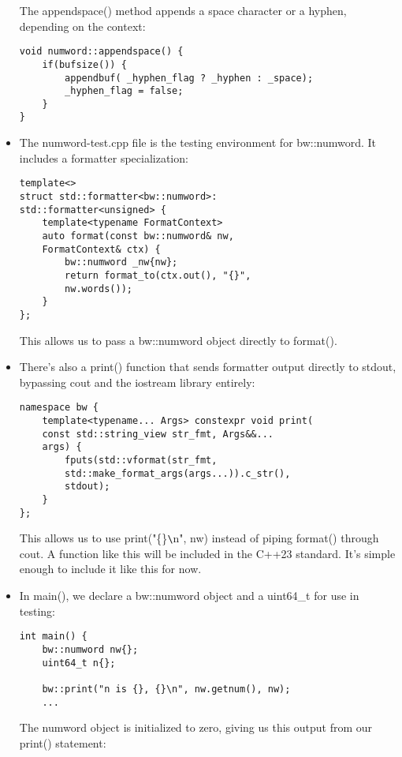 \begin{itemize}
The appendspace() method appends a space character or a hyphen, depending on the context:

\begin{lstlisting}[style=styleCXX]
void numword::appendspace() {
	if(bufsize()) {
		appendbuf( _hyphen_flag ? _hyphen : _space);
		_hyphen_flag = false;
	}
}
\end{lstlisting}

\item 
The numword-test.cpp file is the testing environment for bw::numword. It includes a formatter specialization:

\begin{lstlisting}[style=styleCXX]
template<>
struct std::formatter<bw::numword>:
std::formatter<unsigned> {
	template<typename FormatContext>
	auto format(const bw::numword& nw,
	FormatContext& ctx) {
		bw::numword _nw{nw};
		return format_to(ctx.out(), "{}",
		nw.words());
	}
};
\end{lstlisting}

This allows us to pass a bw::numword object directly to format().

\item 
There's also a print() function that sends formatter output directly to stdout, bypassing cout and the iostream library entirely:

\begin{lstlisting}[style=styleCXX]
namespace bw {
	template<typename... Args> constexpr void print(
	const std::string_view str_fmt, Args&&...
	args) {
		fputs(std::vformat(str_fmt,
		std::make_format_args(args...)).c_str(),
		stdout);
	}
};
\end{lstlisting}

This allows us to use print("\{\}\verb|\|n", nw) instead of piping format() through cout. A function like this will be included in the C++23 standard. It's simple enough to include it like this for now.

\item 
In main(), we declare a bw::numword object and a uint64\_t for use in testing:

\begin{lstlisting}[style=styleCXX]
int main() {
	bw::numword nw{};
	uint64_t n{};
	
	bw::print("n is {}, {}\n", nw.getnum(), nw);
	...
\end{lstlisting}

The numword object is initialized to zero, giving us this output from our print() statement:


\end{itemize}
